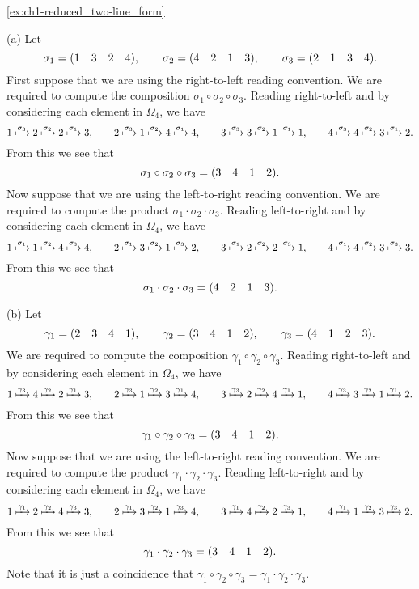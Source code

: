 \begin{solution}{\ref{ex:ch1-reduced_two-line_form}}{(a) Let
    \[
    \sigma_{1} = (1 \quad 3 \quad 2 \quad 4), \qquad \sigma_{2} = (4 \quad 2 \quad 1 \quad 3), \qquad \sigma_{3} = (2 \quad 1 \quad 3 \quad 4).
    \]
    First suppose that we are using the right-to-left reading convention. We are required to compute the composition \(\sigma_{1}\circ\sigma_{2}\circ\sigma_{3}\). Reading right-to-left and by considering each element in \(\Omega_{4}\), we have
    \[
    1 \xmapsto{\sigma_{3}} 2 \xmapsto{\sigma_{2}} 2 \xmapsto{\sigma_{1}} 3,\qquad
    2 \xmapsto{\sigma_{3}} 1 \xmapsto{\sigma_{2}} 4 \xmapsto{\sigma_{1}} 4,\qquad
    3 \xmapsto{\sigma_{3}} 3 \xmapsto{\sigma_{2}} 1 \xmapsto{\sigma_{1}} 1,\qquad
    4 \xmapsto{\sigma_{3}} 4 \xmapsto{\sigma_{2}} 3 \xmapsto{\sigma_{1}} 2.
    \]
    From this we see that
    \[
    \sigma_{1}\circ\sigma_{2}\circ\sigma_{3} = (3 \quad 4 \quad 1 \quad 2).
    \]
    Now suppose that we are using the left-to-right reading convention. We are required to compute the product \(\sigma_{1}\cdot\sigma_{2}\cdot\sigma_{3}\). Reading left-to-right and by considering each element in \(\Omega_{4}\), we have
    \[
    1 \xmapsto{\sigma_{1}} 1 \xmapsto{\sigma_{2}} 4 \xmapsto{\sigma_{3}} 4,\qquad
    2 \xmapsto{\sigma_{1}} 3 \xmapsto{\sigma_{2}} 1 \xmapsto{\sigma_{3}} 2,\qquad
    3 \xmapsto{\sigma_{1}} 2 \xmapsto{\sigma_{2}} 2 \xmapsto{\sigma_{3}} 1,\qquad
    4 \xmapsto{\sigma_{1}} 4 \xmapsto{\sigma_{2}} 3 \xmapsto{\sigma_{3}} 3.
    \]
    From this we see that
    \[
    \sigma_{1}\cdot\sigma_{2}\cdot\sigma_{3} = (4 \quad 2 \quad 1 \quad 3).
    \]

    (b) Let
    \[
    \gamma_{1} = (2 \quad 3 \quad 4 \quad 1), \qquad \gamma_{2} = (3 \quad 4 \quad 1 \quad 2), \qquad \gamma_{3} = (4 \quad 1 \quad 2 \quad 3).
    \]
    We are required to compute the composition \(\gamma_{1}\circ\gamma_{2}\circ\gamma_{3}\). Reading right-to-left and by considering each element in \(\Omega_{4}\), we have
    \[
    1 \xmapsto{\gamma_{3}} 4 \xmapsto{\gamma_{2}} 2 \xmapsto{\gamma_{1}} 3,\qquad
    2 \xmapsto{\gamma_{3}} 1 \xmapsto{\gamma_{2}} 3 \xmapsto{\gamma_{1}} 4,\qquad
    3 \xmapsto{\gamma_{3}} 2 \xmapsto{\gamma_{2}} 4 \xmapsto{\gamma_{1}} 1,\qquad
    4 \xmapsto{\gamma_{3}} 3 \xmapsto{\gamma_{2}} 1 \xmapsto{\gamma_{1}} 2.
    \]
    From this we see that
    \[
    \gamma_{1}\circ\gamma_{2}\circ\gamma_{3} = (3 \quad 4 \quad 1 \quad 2).
    \]
    Now suppose that we are using the left-to-right reading convention. We are required to compute the product \(\gamma_{1}\cdot\gamma_{2}\cdot\gamma_{3}\). Reading left-to-right and by considering each element in \(\Omega_{4}\), we have
    \[
    1 \xmapsto{\gamma_{1}} 2 \xmapsto{\gamma_{2}} 4 \xmapsto{\gamma_{3}} 3,\qquad
    2 \xmapsto{\gamma_{1}} 3 \xmapsto{\gamma_{2}} 1 \xmapsto{\gamma_{3}} 4,\qquad
    3 \xmapsto{\gamma_{1}} 4 \xmapsto{\gamma_{2}} 2 \xmapsto{\gamma_{3}} 1,\qquad
    4 \xmapsto{\gamma_{1}} 1 \xmapsto{\gamma_{2}} 3 \xmapsto{\gamma_{3}} 2.
    \]
    From this we see that
    \[
    \gamma_{1}\cdot\gamma_{2}\cdot\gamma_{3} = (3 \quad 4 \quad 1 \quad 2).
    \]
    Note that it is just a coincidence that \(\gamma_{1}\circ\gamma_{2}\circ\gamma_{3} = \gamma_{1}\cdot\gamma_{2}\cdot\gamma_{3}\).
}\end{solution}